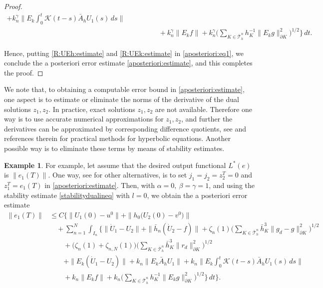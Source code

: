 \documentclass{amsart}
\numberwithin{equation}{section}
\theoremstyle{definition}
\newtheorem{example}{Example}
\begin{document}
\begin{proof}
\begin{equation}
\begin{split}
     +k_n^\gamma \big\|E_k\int_0^t\! {\mathcal K}(t-s)\bar A_hU_1(s)\,ds\big\| \\
    &\qquad \qquad 
     +k_n^\gamma\|E_kf\| 
     +k_n^\gamma\Big(\sum_{K\in \bar {\mathcal T}_h^n}
        h_K^{-1}\|E_kg\|_{\partial K}^2\Big)^{1/2}
     \Big\}\,dt.
  \end{split}
\end{equation}

Hence, putting \eqref{R:UEh:estimate} and
\eqref{R:UEk:estimate} in \eqref{aposteriori:eq1}, 
we conclude the a posteriori error estimate
\eqref{aposteriori:estimate}, and this completes the proof.
\end{proof}

We note that, to obtaining a computable error bound in 
\eqref{aposteriori:estimate}, one aspect is to estimate or eliminate 
the norms of the derivative of the dual solutions $z_1,z_2$.  
In practice, exact solutions $z_1,z_2$ are not available. 
Therefore one way is to use accurate numerical approximations 
for $z_1,z_2$, and further the derivatives can be approximated 
by corresponding difference quotients, see \cite{BangerthGeigerRannacher} 
and references therein for practical methods for hyperbolic equations. 
Another possible way is to eliminate these terms by means of stability estimates. 

\begin{example} \label{Example}
For example, let assume that the desired output functional 
$L^*(e)$ is $\|e_1(T)\|$. 
One way, see  \cite{BangerthGeigerRannacher} for other alternatives, 
is to set $j_1=j_2=z_2^T=0$ and $z_1^T=e_1(T)$ in \eqref{aposteriori:estimate}. 
Then, with $\alpha=0,\ \beta=\gamma=1$, and using the stability 
estimate \eqref{stabilitydualineq} with $l=0$, 
we obtain the a posteriori error estimate
\begin{equation*}  
  \begin{split}
    \| e_1(T)\|
    &\le C  \bigg\{
     \|  U_1(0)-u^0\|
     +\|h_0\big(U_2(0)-v^0\big)\|\\
    &\quad +\sum_{n=1}^N\int_{I_n}\!\Big\{
     \| \dot U_1-U_2 \|+\| \bar h_n(\dot U_2-f)\|+\zeta_n(1)
      \Big(\sum_{K\in\bar{\mathcal T}_h^n}\bar h_K^3
      \|g_d-g\|_{\partial K}^2\Big)^{1/2}\\
    &\quad\quad
    +\big(\zeta_n(1)+\zeta_{n,N}(1)\big)
    \Big(\sum_{K\in\bar{\mathcal T}_h^n}\bar h_K^3
       \|r_d\|_{\partial K}^2\Big)^{1/2} \\
    &\quad\quad  
    +\| E_k(\dot U_1-U_2) \|
    +k_n\|E_k\bar A_hU_1\|+k_n\big\|E_k\int_0^t\!
      {\mathcal K}(t-s)\bar A_hU_1(s)\,ds\big\| \\
    &\quad\quad
    +k_n\|E_kf\|
    +k_n\Big(\sum_{K\in\bar {\mathcal T}_h^n}
      h_K^{-1}\|E_kg\|_{\partial K}^2\Big)^{1/2}
      \Big\}\,dt\bigg\}.
  \end{split}
\end{equation*}
\end{example}
\end{document}
